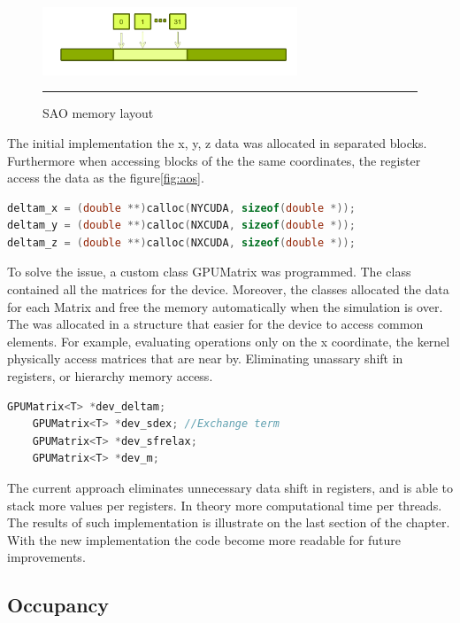 \begin{figure}[htbp]
	\centering
		\includegraphics[width=0.68\textwidth]{Figures/soa.png}
		\rule{35em}{0.2pt}
	\caption[Structure of Arrays (SAO)]{SAO memory layout}
	\label{fig:sao}
\end{figure}

The initial implementation the  x, y, z data was allocated in separated blocks. Furthermore when accessing blocks of the the same coordinates, the register access the data as the figure\ref{fig:aos}.

\begin{lstlisting}[language=C++, caption={AOS implementation}]
deltam_x = (double **)calloc(NYCUDA, sizeof(double *));
deltam_y = (double **)calloc(NXCUDA, sizeof(double *));
deltam_z = (double **)calloc(NXCUDA, sizeof(double *));
\end{lstlisting}

To solve the issue, a custom class GPUMatrix was programmed. The class contained all the matrices for the device. Moreover, the classes allocated the data for each Matrix and free the memory automatically when the simulation is over. The was allocated in a structure that easier for the device to access common elements. For example, evaluating operations only on the x coordinate, the kernel physically access matrices that are near by. Eliminating unassary shift in registers, or hierarchy memory access.

\begin{lstlisting}[language=C++, caption={SOA implementation}]
    GPUMatrix<T> *dev_deltam;
    GPUMatrix<T> *dev_sdex; //Exchange term
    GPUMatrix<T> *dev_sfrelax;
    GPUMatrix<T> *dev_m; 
\end{lstlisting}

The current approach eliminates unnecessary data shift in registers, and is able to stack more values per registers. In theory more computational time per threads. The results of such implementation is illustrate on the last section of the chapter. With the new implementation the code become more readable for future improvements. 

\subsection{Occupancy}
 
